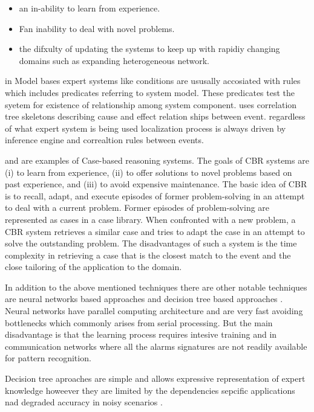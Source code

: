 \documentclass[10pt]{sigplan-proc-varsize}
\begin{document}
\begin{itemize}
  \item an in-ability to learn from experience.
  \item Fan inability to deal with novel problems.
  \item the difxulty of updating the systems to keep up with rapidiy changing domains such as expanding heterogeneous network.
\end{itemize}

in Model bases expert systems like \cite{Nygate:95} conditions are ususally accosiated with rules which includes predicates referring to system model. 
These predicates test the syetem for existence of relationship among system component. \cite{Nygate:95} 
uses correlation tree skeletons describing cause and effect relation ships between event. regardless of what expert system is being used localization process is 
always driven by inference engine and correaltion rules between events. 

\cite{Lewis:93} and \cite{Gardner:96} are examples of Case-based reasoning systems. The goals of CBR systems are (i) to learn from experience, (ii) to 
offer solutions to novel problems based on past experience, and (iii) to avoid expensive maintenance. The basic idea of CBR is to recall, adapt, and 
execute episodes of former problem-solving in an attempt to deal with a current problem. Former episodes of problem-solving are represented as cases in a case 
library. When confronted with a new problem, a CBR system retrieves a similar case and tries to adapt the case in an attempt to solve the outstanding problem. 
The disadvantages of such a system is the time complexity in retrieving a case that is the closest match to the event and the close tailoring of the application 
to the domain.

In addition to the above mentioned techniques there are other notable techniques are neural networks based approaches \cite{Gardner:97} \cite{Gardner:98} and 
decision tree based approaches \cite{Rodosek:98}. Neural networks have parallel computing architecture and are very fast avoiding bottlenecks which 
commonly arises from serial processing. But the main disadvantage is that the learning process requires intesive training  and in communication networks 
where all the alarms signatures are not readily available for pattern recognition.

Decision tree aproaches are simple and allows expressive representation of expert knowledge howeever they are limited by the dependencies sepcific 
applications nad degraded accuracy in noisy scenarios \cite{Russell:96} \cite{Koller:10}.
\end{document}
